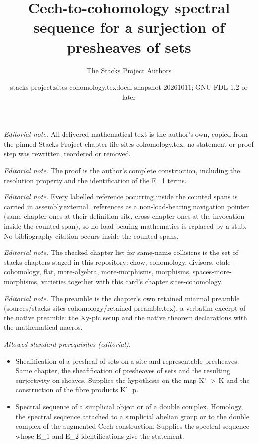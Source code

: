 \documentclass[10pt,a4paper]{amsart}
\title{Cech-to-cohomology spectral sequence for a surjection of presheaves of sets}
\author{The Stacks Project Authors}
\date{stacks-project:sites-cohomology.tex:local-snapshot-20261011; GNU FDL 1.2 or later}
\theoremstyle{plain}
\theoremstyle{definition}
\theoremstyle{remark}
\numberwithin{equation}{subsection}
\begin{document}
\maketitle
\noindent\textit{Editorial note.} All delivered mathematical text is the author's own, copied from the pinned Stacks Project chapter file sites-cohomology.tex; no statement or proof step was rewritten, reordered or removed.\par\medskip
\noindent\textit{Editorial note.} The proof is the author's complete construction, including the resolution property and the identification of the E\_1 terms.\par\medskip
\noindent\textit{Editorial note.} Every labelled reference occurring inside the counted spans is carried in assembly.external\_references as a non-load-bearing navigation pointer (same-chapter ones at their definition site, cross-chapter ones at the invocation inside the counted span), so no load-bearing mathematics is replaced by a stub. No bibliography citation occurs inside the counted spans.\par\medskip
\noindent\textit{Editorial note.} The checked chapter list for same-name collisions is the set of stacks chapters staged in this repository: chow, cohomology, divisors, etale-cohomology, flat, more-algebra, more-morphisms, morphisms, spaces-more-morphisms, varieties together with this card's chapter sites-cohomology.\par\medskip
\noindent\textit{Editorial note.} The preamble is the chapter's own retained minimal preamble (sources/stacks-sites-cohomology/retained-preamble.tex), a verbatim excerpt of the native preamble: the Xy-pic setup and the native theorem declarations with the mathematical macros.\par\medskip
\noindent\textit{Allowed standard prerequisites (editorial).}\begin{itemize}
\item Sheafification of a presheaf of sets on a site and representable presheaves. Same chapter, the sheafification of presheaves of sets and the resulting surjectivity on sheaves. Supplies the hypothesis on the map K' -> K and the construction of the fibre products K'\_p.
\item Spectral sequence of a simplicial object or of a double complex. Homology, the spectral sequence attached to a simplicial abelian group or to the double complex of the augmented Cech construction. Supplies the spectral sequence whose E\_1 and E\_2 identifications give the statement.
\end{itemize}\medskip
\end{document}
